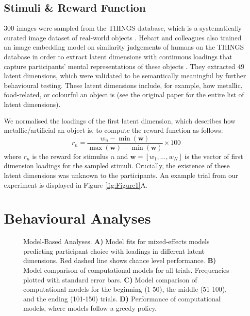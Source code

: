 \documentclass[10pt]{article}
\begin{document}
\subsection{Stimuli \& Reward Function}

$300$ images were sampled from the THINGS database, which is a systematically curated image dataset of real-world objects \citep{hebart_things_2019}. Hebart and colleagues also trained an image embedding model on similarity judgements of humans on the THINGS database in order to extract latent dimensions with continuous loadings that capture participants' mental representations of these objects \citep{hebart_revealing_2020}. They extracted $49$ latent dimensions, which were validated to be semantically meaningful by further behavioural testing. These latent dimensions include, for example, how metallic, food-related, or colourful an object is (see the original paper for the entire list of latent dimensions).

We normalised the loadings of the first latent dimension, which describes how metallic/artificial an object is, to compute the reward function as follows: $$ r_n = \dfrac{w_n - \min(\mathbf{w})}{\max(\mathbf{w}) - \min (\mathbf{w})} \times 100 $$ where $r_n$ is the reward for stimulus $n$ and $\mathbf{w} = [w_1, \ldots, w_{N} ]$ is the vector of first dimension loadings for the sampled stimuli. Crucially, the existence of these latent dimensions was unknown to the participants. An example trial from our experiment is displayed in Figure \ref{fig:Figure1}A.


\section{Behavioural Analyses}

\begin{figure*}[th]
\centering
\resizebox{\textwidth}{!}{}
\caption{Model-Based Analyses. \textbf{A)} Model fits for mixed-effects models predicting participant choice with loadings in different latent dimensions. Red dashed line shows chance level performance. \textbf{B)} Model comparison of computational models for all trials. Frequencies plotted with standard error bars. \textbf{C)} Model comparison of computational models for the beginning (1-50), the middle (51-100), and the ending (101-150) trials. \textbf{D)} Performance of computational models, where models follow a greedy policy. \vspace{-0.5cm}}
\label{fig:Figure2}
\end{figure*}
\end{document}
